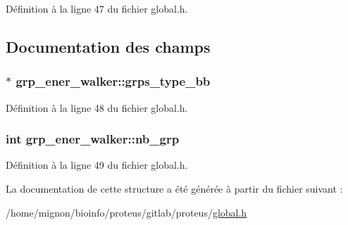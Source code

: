 Définition à la ligne 47 du fichier global.\+h.



\subsection{Documentation des champs}
\hypertarget{structgrp__ener__walker_a780a988459d97e7822099035f7affc55}{
\subsubsection[{grps\+\_\+type\+\_\+bb}]{$\ast$ grp\+\_\+ener\+\_\+walker\+::grps\+\_\+type\+\_\+bb}}\label{structgrp__ener__walker_a780a988459d97e7822099035f7affc55}


Définition à la ligne 48 du fichier global.\+h.

\hypertarget{structgrp__ener__walker_a49ddc6190afbdbb42ad35606564acca4}{
\subsubsection[{nb\+\_\+grp}]{\setlength{\rightskip}{0pt plus 5cm}int grp\+\_\+ener\+\_\+walker\+::nb\+\_\+grp}}\label{structgrp__ener__walker_a49ddc6190afbdbb42ad35606564acca4}


Définition à la ligne 49 du fichier global.\+h.



La documentation de cette structure a été générée à partir du fichier suivant \+:\begin{DoxyCompactItemize}
\item 
/home/mignon/bioinfo/proteus/gitlab/proteus/\hyperlink{global_8h}{global.\+h}\end{DoxyCompactItemize}
